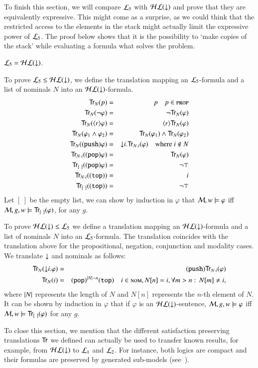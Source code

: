 To finish this section, we will compare $\mathcal{L}_5$ with $\mathcal{HL}({\downarrow})$ and
prove that they are equivalently expressive.  This might come as a
surprise, as we could think that the restricted access to the elements
in the stack might actually limit the expressive power of $\mathcal{L}_5$.
The proof below shows that it is the possibility to `make copies of
the stack' while evaluating a formula what solves the problem.

\begin{thm}\label{prop:stack_leq_hl}
$\mathcal{L}_5 = \mathcal{HL}({\downarrow})$.
\end{thm}

\begin{pf}
To prove $\mathcal{L}_5 \le \mathcal{HL}({\downarrow})$, we define
the translation mapping an $\mathcal{L}_5$-formula and a list of
nominals $N$ into an $\mathcal{HL}({\downarrow})$-formula.
\begin{eqnarray*}
{\sf Tr}_N(p) & = & p \quad p \in \textsc{prop}\\
{\sf Tr}_N(\lnot \varphi) & = & \lnot {\sf Tr}_N(\varphi) \\
{\sf Tr}_N(\langle r \rangle \varphi) & = & \langle r \rangle {\sf Tr}_N(\varphi) \\
{\sf Tr}_N(\varphi_1 \land \varphi_2) & = & {\sf Tr}_N(\varphi_1) \land {\sf Tr}_N(\varphi_2)\\
{\sf Tr}_N({\tt (push)} \varphi) & = & {\downarrow} i. {\sf Tr}_{N\cdot i}(\varphi) \quad
\textrm{where $i \notin N$}\\
{\sf Tr}_{N\cdot i}({\tt (pop)} \varphi) & = & {\sf Tr}_{N}(\varphi)\\
{\sf Tr}_{[\ ]}({\tt (pop)} \varphi) & = & \lnot\top\\
{\sf Tr}_{N\cdot i}({\tt (top)}) & = & i\\
{\sf Tr}_{[\ ]}({\tt (top)}) & = & \lnot\top
\end{eqnarray*}
Let $[\ ]$ be the empty list, we can show
by induction in $\varphi$ that $\mathcal{M}, w \models
\varphi$ iff $\mathcal{M}, g, w \models {\sf Tr}_{[\ ]}(\varphi)$, for any $g$.
\smallskip

To prove $\mathcal{HL}({\downarrow}) \le \mathcal{L}_5$ we define a translation mapping an
$\mathcal{HL}({\downarrow})$-formula and a list of nominals $N$ into an
$\mathcal{L}_5$-formula. The translation coincides with the translation
above for the propositional, negation, conjunction and modality
cases. We translate ${\downarrow}$ and nominals as follows:
\begin{eqnarray*}
{\sf Tr}_N({\downarrow} i.\varphi) & = & {\tt (push)}{\sf Tr}_{N\cdot i}(\varphi)\\
{\sf Tr}_N(i) & = & {\tt (pop)}^{|N|-n}{\tt (top)} \quad i \in \textsc{nom}, N[n]=i,
\forall m>n:\, N[m]\not=i,
\end{eqnarray*}
where $|N|$ represents the length of $N$ and $N[n]$ represents
the $n$-th element of $N$. It can be shown by induction in $\varphi$
that if $\varphi$ is an $\mathcal{HL}({\downarrow})$-sentence, $\mathcal{M}, g, w \models
\varphi$ iff $\model, w \models \Tr_{[\ ]}(\varphi)$ for any $g$.
\end{pf}

To close this section, we mention that the different satisfaction preserving
translations ${\sf Tr}$ we defined can actually be used to transfer
known results, for example, from  $\mathcal{HL}({\downarrow})$ to $\mathcal{L}_1$ and
$\mathcal{L}_2$.  For instance, both logics are compact and their formulas
are preserved by generated sub-models (see~\cite{areces01:_hybrid}).
